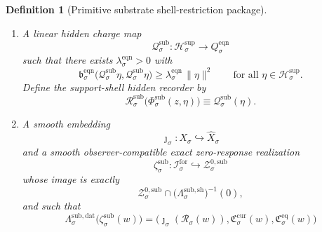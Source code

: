 \documentclass[11pt]{article}
\newcommand{\ForSpace}[1]{\mathcal I_{#1}^{\mathrm{for}}}
\newcommand{\Reduction}[1]{\mathcal R_{#1}}
\newcommand{\CurrentCarrier}[1]{\mathfrak C_{#1}^{\mathrm{cur}}}
\newcommand{\EqCarrier}[1]{\mathfrak C_{#1}^{\mathrm{eq}}}
\newcommand{\VisibleAffine}[1]{\widehat X_{#1}}
\newcommand{\DataSpace}[1]{\mathcal Y_{#1}^{\mathrm{obs}}}
\newcommand{\AmbientTarget}[1]{E_{#1}^{\mathrm{amb}}}
\newcommand{\EqnSpace}[1]{\mathcal U_{#1}^{\mathrm{eqn}}}
\newcommand{\EqnBody}[1]{\mathcal B_{#1}^{\mathrm{eqn}}}
\newcommand{\EqnData}[1]{\Lambda_{#1}^{\mathrm{eqn,dat}}}
\newcommand{\EqnShell}[1]{\Lambda_{#1}^{\mathrm{eqn,sh}}}
\newcommand{\EqnTarget}[1]{Q_{#1}^{\mathrm{eqn}}}
\newcommand{\EqnPair}[1]{\mathfrak b_{#1}^{\mathrm{eqn}}}
\newcommand{\EqnZero}[1]{V_{#1}^{\mathrm{eqn},0}}
\newcommand{\EqnHidden}[1]{H_{#1}^{\mathrm{eqn}}}
\newcommand{\SeedHidden}[1]{\mathcal H_{#1}^{\mathrm{sup}}}
\newcommand{\SubData}[1]{\Lambda_{#1}^{\mathrm{sub,dat}}}
\newcommand{\SubShellMap}[1]{\Lambda_{#1}^{\mathrm{sub,sh}}}
\newcommand{\SubSupportShell}[1]{\mathcal Z_{#1}^{\mathrm{sub,sup}}}
\newcommand{\SubZeroCore}[1]{\mathcal Z_{#1}^{0,\mathrm{sub}}}
\newcommand{\ShellChart}[1]{\Psi_{#1}^{\mathrm{sup}}}
\newcommand{\SubZeroChart}[1]{\Psi_{#1}^{0,\mathrm{sub}}}
\newcommand{\HiddenChart}[1]{\Psi_{#1}^{\mathrm{hid}}}
\newcommand{\SubSplit}[1]{\Phi_{#1}^{\mathrm{sub}}}
\newcommand{\SubCharge}[1]{\mathcal Q_{#1}^{\mathrm{sub}}}
\newcommand{\SubResidual}[1]{\mathcal R_{#1}^{\mathrm{sub}}}
\newcommand{\SubEmbed}[1]{\zeta_{#1}^{\mathrm{sub}}}
\newtheorem{definition}{Definition}
\begin{document}
\begin{definition}[Primitive substrate shell-restriction package]
\begin{enumerate}
\begin{equation}
    =
    \SubZeroChart{\sigma}(z)+\HiddenChart{\sigma}(\eta).
    \label{eq:subchartsplit}
    \end{equation}
    The shell readouts become affine in the support-shell chart: there exist affine maps
    \[
    \EqnData{\sigma}:\EqnSpace{\sigma}\to\DataSpace{\sigma},
    \qquad
    \EqnShell{\sigma}:\EqnSpace{\sigma}\to\AmbientTarget{\sigma},
    \]
    such that
    \begin{equation}
    \EqnData{\sigma}\circ\ShellChart{\sigma}
    =
    \SubData{\sigma}\big|_{\SubSupportShell{\sigma}},
    \qquad
    \EqnShell{\sigma}\circ\ShellChart{\sigma}
    =
    \SubShellMap{\sigma}\big|_{\SubSupportShell{\sigma}}.
    \label{eq:eqnchartreadouts}
    \end{equation}
    The transported symmetry and time-reversal actions act linearly on \(\EqnSpace{\sigma}\), preserving \(\EqnZero{\sigma}\), \(\EqnHidden{\sigma}\), and \(\EqnBody{\sigma}\).
    \item A linear hidden charge map
    \[
    \SubCharge{\sigma}:\SeedHidden{\sigma}\to\EqnTarget{\sigma}
    \]
    such that there exists \(\lambda_{\sigma}^{\mathrm{eqn}}>0\) with
    \begin{equation}
    \EqnPair{\sigma}\bigl(\SubCharge{\sigma}\eta,\SubCharge{\sigma}\eta\bigr)
    \ge
    \lambda_{\sigma}^{\mathrm{eqn}}\,
    \|\eta\|^{2}
    \qquad
    \text{for all }\eta\in\SeedHidden{\sigma}.
    \label{eq:subchargegap}
    \end{equation}
    Define the support-shell hidden recorder by
    \begin{equation}
    \SubResidual{\sigma}\bigl(\SubSplit{\sigma}(z,\eta)\bigr)
    \equiv
    \SubCharge{\sigma}(\eta).
    \label{eq:subresidual}
    \end{equation}
    \item A smooth embedding
    \[
    \jmath_{\sigma}:X_{\sigma}\hookrightarrow\VisibleAffine{\sigma}
    \]
    and a smooth observer-compatible exact zero-response realization
    \[
    \SubEmbed{\sigma}:\ForSpace{\sigma}\hookrightarrow\SubZeroCore{\sigma}
    \]
    whose image is exactly
    \[
    \SubZeroCore{\sigma}
    \cap
    \bigl(\SubShellMap{\sigma}\bigr)^{-1}(0),
    \]
    and such that
    \begin{equation}
    \SubData{\sigma}\bigl(\SubEmbed{\sigma}(w)\bigr)
    =
    \bigl(
    \jmath_{\sigma}(\Reduction{\sigma}(w)),
    \CurrentCarrier{\sigma}(w),
    \EqCarrier{\sigma}(w)
    \bigr)
    \label{eq:subcompat}
    \end{equation}

\end{enumerate}
\end{definition}
\end{document}
